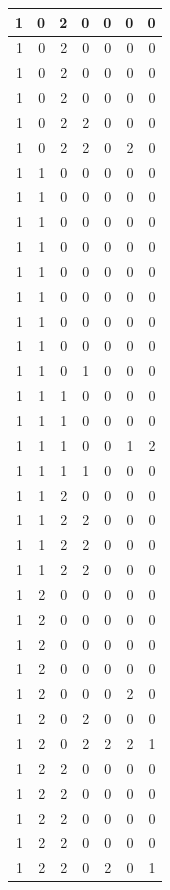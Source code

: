 \documentclass[
  12pt,
]{krantz}
\begin{document}
\begin{tabular}{r|r|r|r|r|r|r}
\hline
1 & 0 & 2 & 0 & 0 & 0 & 0\\
\hline
1 & 0 & 2 & 0 & 0 & 0 & 0\\
\hline
1 & 0 & 2 & 0 & 0 & 0 & 0\\
\hline
1 & 0 & 2 & 0 & 0 & 0 & 0\\
\hline
1 & 0 & 2 & 2 & 0 & 0 & 0\\
\hline
1 & 0 & 2 & 2 & 0 & 2 & 0\\
\hline
1 & 1 & 0 & 0 & 0 & 0 & 0\\
\hline
1 & 1 & 0 & 0 & 0 & 0 & 0\\
\hline
1 & 1 & 0 & 0 & 0 & 0 & 0\\
\hline
1 & 1 & 0 & 0 & 0 & 0 & 0\\
\hline
1 & 1 & 0 & 0 & 0 & 0 & 0\\
\hline
1 & 1 & 0 & 0 & 0 & 0 & 0\\
\hline
1 & 1 & 0 & 0 & 0 & 0 & 0\\
\hline
1 & 1 & 0 & 0 & 0 & 0 & 0\\
\hline
1 & 1 & 0 & 1 & 0 & 0 & 0\\
\hline
1 & 1 & 1 & 0 & 0 & 0 & 0\\
\hline
1 & 1 & 1 & 0 & 0 & 0 & 0\\
\hline
1 & 1 & 1 & 0 & 0 & 1 & 2\\
\hline
1 & 1 & 1 & 1 & 0 & 0 & 0\\
\hline
1 & 1 & 2 & 0 & 0 & 0 & 0\\
\hline
1 & 1 & 2 & 2 & 0 & 0 & 0\\
\hline
1 & 1 & 2 & 2 & 0 & 0 & 0\\
\hline
1 & 1 & 2 & 2 & 0 & 0 & 0\\
\hline
1 & 2 & 0 & 0 & 0 & 0 & 0\\
\hline
1 & 2 & 0 & 0 & 0 & 0 & 0\\
\hline
1 & 2 & 0 & 0 & 0 & 0 & 0\\
\hline
1 & 2 & 0 & 0 & 0 & 0 & 0\\
\hline
1 & 2 & 0 & 0 & 0 & 2 & 0\\
\hline
1 & 2 & 0 & 2 & 0 & 0 & 0\\
\hline
1 & 2 & 0 & 2 & 2 & 2 & 1\\
\hline
1 & 2 & 2 & 0 & 0 & 0 & 0\\
\hline
1 & 2 & 2 & 0 & 0 & 0 & 0\\
\hline
1 & 2 & 2 & 0 & 0 & 0 & 0\\
\hline
1 & 2 & 2 & 0 & 0 & 0 & 0\\
\hline
1 & 2 & 2 & 0 & 2 & 0 & 1\\

\end{tabular}
\end{document}
